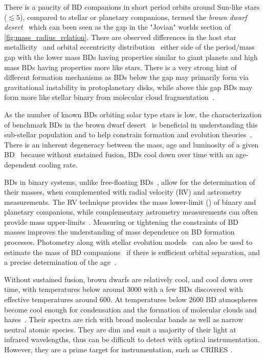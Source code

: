 There is a paucity of {BD} companions in short period orbits around Sun-like stars (\(\lesssim{}5 \)\AU{}), compared to stellar or planetary companions, termed the \emph{brown dwarf desert}~\citep{halbwachs_exploring_2000, zucker_analysis_2001, sahlmann_search_2011, ranc_moa2007blg197_2015} which can been seen as the gap in the "Jovian" worlds section of \cref{fig:mass_radius_relation}.
There are observed differences in the host star metallicity~\citep{maldonado_searching_2017, santos_observational_2017, schlaufman_evidence_2018} and orbital eccentricity distribution~\citep{ma_statistical_2014} either side of the period/mass gap with the lower mass {BD}s having properties similar to giant planets and high mass {BD}s having properties more like stars.
There is a very strong hint of different formation mechanisms as {BD}s below the gap may primarily form via gravitational instability in protoplanetary disks, while above this gap {BD}s may form more like stellar binary from molecular cloud fragmentation~\citep{ma_statistical_2014}.

As the number of known {BD}s orbiting solar type stars is low, the characterization of benchmark {BD}s in the brown dwarf desert~\citep[e.g.][]{crepp_trends_2016} is beneficial in understanding this sub-stellar population and to help constrain formation and evolution theories~\citep{whitworth_formation_2007}.
There is an inherent degeneracy between the mass, age and luminosity of a given BD~\citep{burrows_nongray_1997} because without sustained fusion, {BD}s cool down over time with an age-dependent cooling rate.

{BD}s in binary systems, unlike free-floating {BD}s~\citep[e.g][]{gagne_simp_2017}, allow for the determination of their masses, when complemented with radial velocity ({RV}) and astrometry measurements.
The {RV} technique provides the mass lower-limit (\Mtwosini{}) of binary and planetary companions, while complementary astrometry measurements can often provide mass upper-limits~\citep[e.g.][]{sahlmann_search_2011}.
Measuring or tightening the constraints of {BD} masses improves the understanding of mass dependence on {BD} formation processes.
Photometry along with stellar evolution models~\citep[e.g.][]{baraffe_evolutionary_2003,allard_btsettl_2013} can also be used to estimate the mass of {BD} companions~\citep[e.g.][]{moutou_eccentricity_2017} if there is sufficient orbital separation, and a precise determination of the age~\citep{soderblom_ages_2010}.


Without sustained fusion, brown dwarfs are relatively cool, and cool down over time, with temperatures below around {3000\K{}} with a few BDs discovered with effective temperatures around 600\K{}\citep{leggett_physical_2009}.
At temperatures below 2600\K{} BD atmospheres become cool enough for condensation and the formation of molecular clouds and hazes~\citep{allard_atmospheres_2012, helling_atmospheres_2014}.
Their spectra are rich with broad molecular bands as well as narrow neutral atomic species.
They are dim and emit a majority of their light at infrared wavelengths, thus can be difficult to detect with optical instrumentation.
However, they are a prime target for \nir{} instrumentation, such as CRIRES \citep[e.g.][]{guenther_prospects_2006,crossfield_global_2014}.



